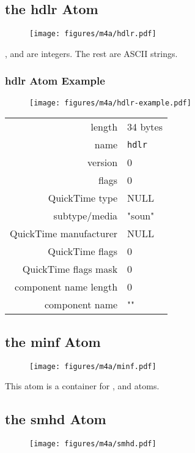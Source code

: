 \clearpage

\subsection{the hdlr Atom}

\begin{figure}[h]
\texttt{[image: figures/m4a/hdlr.pdf]}
\end{figure}
\par
\noindent
{},  and
are integers.  The rest are ASCII strings.

\subsubsection{hdlr Atom Example}
\begin{figure}[h]
\texttt{[image: figures/m4a/hdlr-example.pdf]}
\end{figure}
\begin{tabular}{rl}
  \textsf{length} & 34 bytes \\
  \textsf{name} & \texttt{hdlr} \\
  \textsf{version} & 0 \\
  \textsf{flags} & 0 \\
  \textsf{QuickTime type} & NULL \\
  \textsf{subtype/media} & \textsf{"soun"} \\
  \textsf{QuickTime manufacturer} & NULL \\
  \textsf{QuickTime flags} & 0 \\
  \textsf{QuickTime flags mask} & 0 \\
  \textsf{component name length} & 0 \\
  \textsf{component name} & \textsf{""} \\
\end{tabular}

\clearpage

\subsection{the minf Atom}
\begin{figure}[h]
  \texttt{[image: figures/m4a/minf.pdf]}
\end{figure}
\par
\noindent
This atom is a container for ,  and  atoms.

\subsection{the smhd Atom}
\begin{figure}[h]
  \texttt{[image: figures/m4a/smhd.pdf]}
\end{figure}

